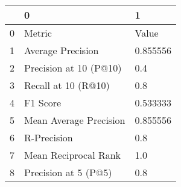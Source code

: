 \begin{tabular}{lll}
\toprule
{} &                       0 &         1 \\
\midrule
0 &                  Metric &     Value \\
1 &       Average Precision &  0.855556 \\
2 &  Precision at 10 (P@10) &       0.4 \\
3 &     Recall at 10 (R@10) &       0.8 \\
4 &                F1 Score &  0.533333 \\
5 &  Mean Average Precision &  0.855556 \\
6 &             R-Precision &       0.8 \\
7 &    Mean Reciprocal Rank &       1.0 \\
8 &    Precision at 5 (P@5) &       0.8 \\
\bottomrule
\end{tabular}
